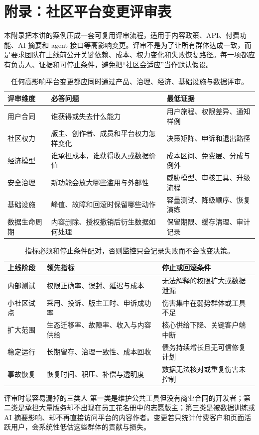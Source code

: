 \section{附录：社区平台变更评审表}

本附录把本讲的案例压成一套可复用评审流程，适用于内容政策、API、付费功能、AI 摘要和 agent 接口等高影响变更。评审不是为了让所有群体达成一致，而是要求团队在上线前公开关键依赖、成本、权力变化和失败恢复路径。每一项都应有负责人、证据和可停止条件，避免把“社区会适应”当作默认假设。

\begin{table}[H]
\centering
\begin{tabular}{L{0.18\textwidth}L{0.33\textwidth}L{0.39\textwidth}}
\toprule
评审维度 & 必答问题 & 最低证据 \\
\midrule
用户合同 & 谁获得或失去什么能力 & 用户旅程、权限差异、通知样例 \\
社区权力 & 版主、创作者、成员和平台权力怎样变化 & 决策矩阵、申诉和退出路径 \\
经济模型 & 谁承担成本，谁获得收入或数据价值 & 成本区间、免费层、分成与例外 \\
安全治理 & 新功能会放大哪些滥用与外部性 & 威胁模型、审核工具、升级流程 \\
基础设施 & 峰值、故障和回滚时保留哪些动作 & 容量测试、降级顺序、恢复演练 \\
数据生命周期 & 内容删除、授权撤销后衍生数据如何处理 & 保留期限、缓存清理、审计记录 \\
\bottomrule
\end{tabular}
\caption{任何高影响平台变更都应同时通过产品、治理、经济、基础设施与数据评审。}
\end{table}

\begin{table}[H]
\centering
\begin{tabular}{L{0.2\textwidth}L{0.32\textwidth}L{0.38\textwidth}}
\toprule
上线阶段 & 领先指标 & 停止或回滚条件 \\
\midrule
内部测试 & 权限正确率、误封、延迟与成本 & 无法解释的权限扩大或数据泄漏 \\
小社区试点 & 采用、投诉、版主工时、申诉成功率 & 伤害集中在弱势群体或工具不足 \\
扩大范围 & 生态迁移率、故障率、收入与内容供给 & 核心供给下降、关键客户端中断 \\
稳定运行 & 长期留存、治理一致性、成本回收 & 债务持续增长且无可信修复计划 \\
事故恢复 & 恢复时间、积压、补偿与透明度 & 数据无法核对或重复伤害未控制 \\
\bottomrule
\end{tabular}
\caption{指标必须和停止条件配对，否则监控只会记录失败而不会改变决策。}
\end{table}

\begin{warningbox}{评审时最容易漏掉的三类人}
第一类是维护公共工具但没有商业合同的开发者；第二类是承担大量版务却不出现在员工花名册中的志愿版主；第三类是被数据训练或 AI 摘要影响、却不再直接访问平台的内容作者。变更若只统计付费客户和页面活跃用户，会系统性低估这些群体的贡献与损失。
\end{warningbox}


